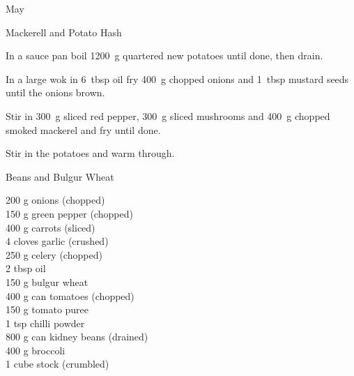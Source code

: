 \begin{menu}{May}
\begin{recipe}{2}{Mackerell and Potato Hash}
\begin{ingredients}
		\end{ingredients}
	
	
    \begin{instructions}
    \item 
        In a sauce pan boil
        1200~g quartered new potatoes
        until done,
        then drain.
      \item 
        In a large wok in
        6~tbsp  oil
        fry
        400~g chopped onions
        and
        1~tbsp  mustard seeds
        until the onions brown.
      \item 
        Stir in
        300~g sliced red pepper,
        300~g sliced mushrooms
        and
        400~g chopped smoked mackerel
        and fry until done.
      \item 
        Stir in the potatoes
        and warm through.
      
    \end{instructions}
    \end{recipe}%
  
    \begin{recipe}{2}{Beans and Bulgur Wheat}%
		\begin{ingredients}
		200 g onions (chopped) \\
	150 g green pepper (chopped) \\
	400 g carrots (sliced) \\
	4 cloves garlic (crushed) \\
	250 g celery (chopped) \\
	2 tbsp oil  \\
	150 g bulgur wheat  \\
	400 g can tomatoes (chopped) \\
	150 g tomato puree  \\
	1 tsp chilli powder  \\
	800 g can kidney beans (drained) \\
	400 g broccoli  \\
	1 cube stock (crumbled) \\
	
		\end{ingredients}
	
	

\end{recipe}
\end{menu}
